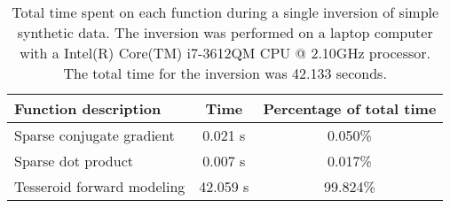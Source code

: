 
\begin{table}
    \centering
    \caption{
        Total time spent on each function during a single inversion of
        simple synthetic data.
        The inversion was performed on a laptop computer with a
        Intel(R) Core(TM) i7-3612QM CPU @ 2.10GHz processor.
        The total time for the inversion was 42.133 seconds.        
    }
    \label{profiling}
    \begin{tabular}{lcc}
        Function description & Time & Percentage of total time\\
        \hline 
        Sparse conjugate gradient & 0.021 s & 0.050\%\\
        Sparse dot product & 0.007 s & 0.017\%\\
        Tesseroid forward modeling & 42.059 s & 99.824\%\\
        \hline
    \end{tabular}
\end{table}
